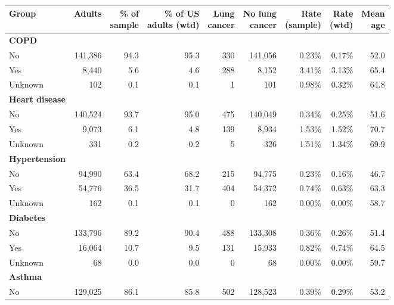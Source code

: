 \begin{tabular*}{\textwidth}{@{\extracolsep{\fill}}lrrrrrrrr}
\toprule
Group & Adults & \makecell[b]{\% of\\{}sample} & \makecell[b]{\% of US\\{}adults (wtd)} & \makecell[b]{Lung\\{}cancer} & \makecell[b]{No lung\\{}cancer} & \makecell[b]{Rate\\{}(sample)} & \makecell[b]{Rate\\{}(wtd)} & \makecell[b]{Mean\\{}age} \\
\midrule
\textbf{COPD} &  &  &  &  &  &  &  &  \\
\quad No & 141,386 & 94.3 & 95.3 & 330 & 141,056 & 0.23\% & 0.17\% & 52.0 \\
\quad Yes & 8,440 & 5.6 & 4.6 & 288 & 8,152 & 3.41\% & 3.13\% & 65.4 \\
\quad Unknown & 102 & 0.1 & 0.1 & 1 & 101 & 0.98\% & 0.32\% & 64.8 \\
\midrule
\textbf{Heart disease} &  &  &  &  &  &  &  &  \\
\quad No & 140,524 & 93.7 & 95.0 & 475 & 140,049 & 0.34\% & 0.25\% & 51.6 \\
\quad Yes & 9,073 & 6.1 & 4.8 & 139 & 8,934 & 1.53\% & 1.52\% & 70.7 \\
\quad Unknown & 331 & 0.2 & 0.2 & 5 & 326 & 1.51\% & 1.34\% & 69.9 \\
\midrule
\textbf{Hypertension} &  &  &  &  &  &  &  &  \\
\quad No & 94,990 & 63.4 & 68.2 & 215 & 94,775 & 0.23\% & 0.16\% & 46.7 \\
\quad Yes & 54,776 & 36.5 & 31.7 & 404 & 54,372 & 0.74\% & 0.63\% & 63.3 \\
\quad Unknown & 162 & 0.1 & 0.1 & 0 & 162 & 0.00\% & 0.00\% & 58.7 \\
\midrule
\textbf{Diabetes} &  &  &  &  &  &  &  &  \\
\quad No & 133,796 & 89.2 & 90.4 & 488 & 133,308 & 0.36\% & 0.26\% & 51.4 \\
\quad Yes & 16,064 & 10.7 & 9.5 & 131 & 15,933 & 0.82\% & 0.74\% & 64.5 \\
\quad Unknown & 68 & 0.0 & 0.0 & 0 & 68 & 0.00\% & 0.00\% & 59.7 \\
\midrule
\textbf{Asthma} &  &  &  &  &  &  &  &  \\
\quad No & 129,025 & 86.1 & 85.8 & 502 & 128,523 & 0.39\% & 0.29\% & 53.2 \\

\end{tabular*}
